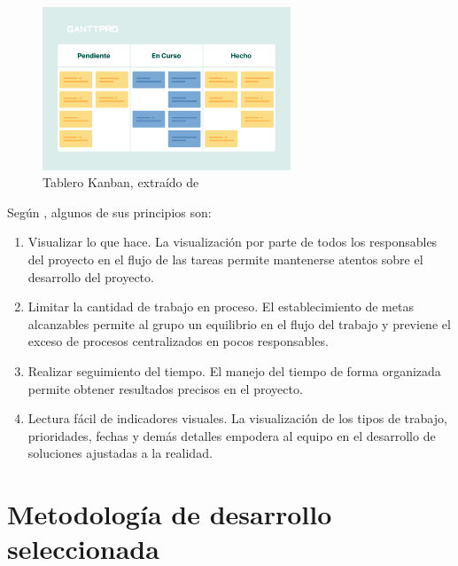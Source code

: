 \begin{itemize}
            \begin{figure}[h]
                \centering
                \includegraphics[width=0.66\textwidth]{figures/kanban.png}
                \caption[Tablero Kanban]{Tablero Kanban, extraído de \cite{stsepanets_metodo_2024}}
                \label{fig:metodologia:kanban}
            \end{figure}
            
    
            Según \cite{valtx_metodologias_2023}, algunos de sus principios son: 
    
            \begin{enumerate}
                \item Visualizar lo que hace. La visualización por parte de todos los responsables del proyecto en el flujo de las tareas permite mantenerse atentos sobre el desarrollo del proyecto.
                \item Limitar la cantidad de trabajo en proceso. El establecimiento de metas alcanzables permite al grupo un equilibrio en el flujo del trabajo y previene el exceso de procesos centralizados en pocos responsables.
                \item Realizar seguimiento del tiempo. El manejo del tiempo de forma organizada permite obtener resultados precisos en el proyecto.
                \item Lectura fácil de indicadores visuales. La visualización de los tipos de trabajo, prioridades, fechas y demás detalles empodera al equipo en el desarrollo de soluciones ajustadas a la realidad.
            \end{enumerate}
            
        \end{itemize}

\section{Metodología de desarrollo seleccionada}

